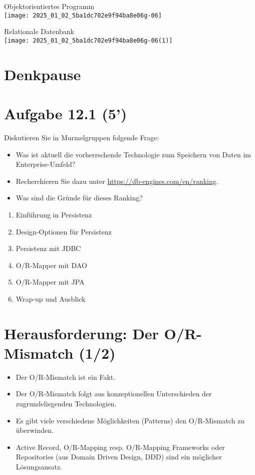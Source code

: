 Objektorientiertes Programm\\
\texttt{[image: 2025\_01\_02\_5ba1dc702e9f94ba8e06g-06]}

Relationale Datenbank\\
\texttt{[image: 2025\_01\_02\_5ba1dc702e9f94ba8e06g-06(1)]}

\section*{Denkpause}
\section*{Aufgabe 12.1 (5')}
Diskutieren Sie in Murmelgruppen folgende Frage:

\begin{itemize}
  \item Was ist aktuell die vorherrschende Technologie zum Speichern von Daten im Enterprise-Umfeld?
  \item Recherchieren Sie dazu unter \href{https://db-engines.com/en/ranking}{https://db-engines.com/en/ranking}.
  \item Was sind die Gründe für dieses Ranking?
\end{itemize}

\begin{enumerate}
  \item Einführung in Persistenz
  \item Design-Optionen für Persistenz
  \item Persistenz mit JDBC
  \item O/R-Mapper mit DAO
  \item O/R-Mapper mit JPA
  \item Wrap-up und Ausblick
\end{enumerate}

\section*{Herausforderung: Der O/R-Mismatch (1/2)}
\begin{itemize}
  \item Der O/R-Mismatch ist ein Fakt.
  \item Der O/R-Mismatch folgt aus konzeptionellen Unterschieden der zugrundeliegenden Technologien.
  \item Es gibt viele verschiedene Möglichkeiten (Patterns) den O/R-Mismatch zu überwinden.
  \item Active Record, O/R-Mapping resp. O/R-Mapping Frameworks oder Repositories (aus Domain Driven Design, DDD) sind ein möglicher Lösungsansatz.
\end{itemize}

